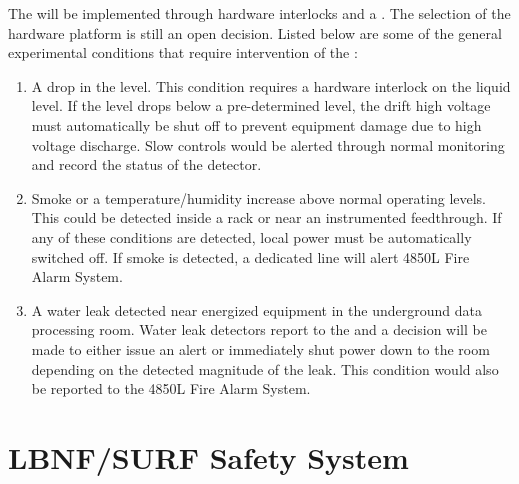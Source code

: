 The  will be implemented through hardware interlocks and a
.  The selection of the  hardware platform is still an open decision.  Listed below are some of the general  experimental conditions that require intervention of the :
\begin{enumerate}
 \item A drop in the  level.  This condition requires a hardware
   interlock on the liquid level.  If the level drops below a
   pre-determined level, the drift high voltage must automatically be 
   shut off to prevent equipment damage due to high voltage discharge.  Slow controls would be
   alerted through normal monitoring and record the status of the detector.
 \item Smoke or a temperature/humidity increase above normal operating
   levels. This could be detected inside a rack or near an instrumented
   feedthrough.  If any of these conditions are detected, local
   power must be automatically switched off. If smoke is detected, a
   dedicated line will alert 4850L Fire Alarm System.
 \item A water leak detected near energized equipment in the 
   underground data processing room.  Water leak detectors 
   report to the   and a decision will be made to either
   issue an alert or immediately shut power down to the room depending
   on the detected magnitude of the leak.  This condition would also be reported
   to the 4850L Fire Alarm System.
\end{enumerate}



\section{LBNF/SURF Safety System}
\label{sec:fdsp-coord-surf-safety}

